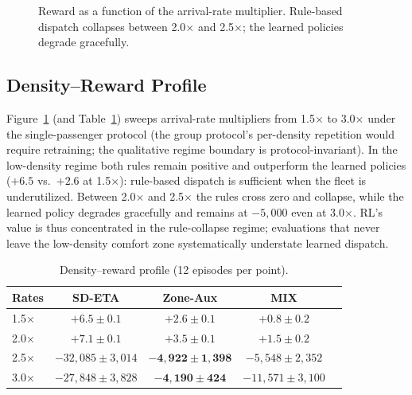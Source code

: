 \documentclass[conference]{IEEEtran}
\begin{document}
\begin{figure}[t]
\centering
{}
\caption{Reward as a function of the arrival-rate multiplier.
Rule-based dispatch collapses between 2.0$\times$ and 2.5$\times$;
the learned policies degrade gracefully.}
\label{fig:density}
\end{figure}

\subsection{Density--Reward Profile}

Figure~\ref{fig:density} (and Table~\ref{tab:density}) sweeps
arrival-rate multipliers from 1.5$\times$ to 3.0$\times$ under the
single-passenger protocol (the group protocol's per-density
repetition would require retraining; the qualitative regime boundary
is protocol-invariant). In the
low-density regime both rules remain positive and outperform the
learned policies ($+6.5$ vs.~$+2.6$ at 1.5$\times$): rule-based
dispatch is sufficient when the fleet is underutilized. Between
2.0$\times$ and 2.5$\times$ the rules cross zero and collapse, while
the learned policy degrades gracefully and remains at $-5{,}000$
even at 3.0$\times$. RL's value is thus concentrated in the
rule-collapse regime; evaluations that never leave the
low-density comfort zone systematically understate learned
dispatch.

\begin{table}[t]
\centering
\caption{Density--reward profile (12 episodes per point).}
\label{tab:density}
\begin{tabular}{@{}lcccc@{}}
\toprule
Rates & SD-ETA & Zone-Aux & MIX \\
\midrule
1.5$\times$ & $+6.5 \pm 0.1$ & $+2.6 \pm 0.1$ & $+0.8 \pm 0.2$ \\
2.0$\times$ & $+7.1 \pm 0.1$ & $+3.5 \pm 0.1$ & $+1.5 \pm 0.2$ \\
2.5$\times$ & $-32{,}085 \pm 3{,}014$ & $\mathbf{-4{,}922 \pm 1{,}398}$ &
$-5{,}548 \pm 2{,}352$ \\
3.0$\times$ & $-27{,}848 \pm 3{,}828$ & $\mathbf{-4{,}190 \pm 424}$ &
$-11{,}571 \pm 3{,}100$ \\
\bottomrule
\end{tabular}
\end{table}
\end{document}
